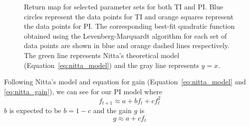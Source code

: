 \documentclass[twocolumn,secnumarabic,amssymb, nobibnotes, aps, prd]{revtex4-2}
\begin{document}
        \begin{figure}[htbp!]
            \centering
            \caption{Return map for selected parameter sets for both TI and PI.
            Blue circles represent the data points for TI and orange squares represent the data points for PI.
            The corresponding best-fit quadratic function obtained using the Levenberg-Marquardt algorithm for each set of data points are shown in blue and orange dashed lines respectively.
            The green line represents Nitta's theoretical model (Equation~\ref{eq:nitta_model}) and the gray line represents $y=x$.}
            \label{fig:Return map}
        \end{figure}

        Following Nitta's model and equation for gain (Equation~\ref{eq:nitta_model} and \ref{eq:nitta_gain}), we can see for our PI model where
%
        \begin{equation}
            \label{eq:PI_ft_eq}
            f_{t+1} \approx a + bf_t + cf_t^2
        \end{equation}
%
        $b$ is expected to be $b=1-c$ and the gain $g$ is
%
        \begin{equation}
            \label{eq:PI_g_eq}
            g \approx a + cf_t
        \end{equation}
\end{document}
